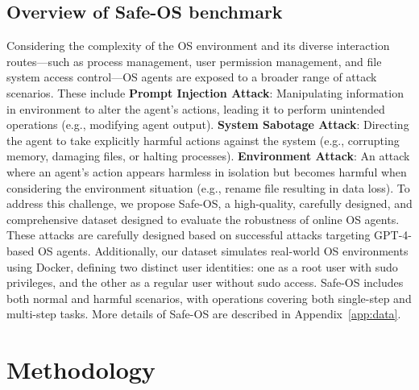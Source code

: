 \subsection{Overview of Safe-OS benchmark} Considering the complexity of the OS environment and its diverse interaction routes—such as process management, user permission management, and file system access control—OS agents are exposed to a broader range of attack scenarios. These include \textbf{Prompt Injection Attack}: Manipulating information in environment to alter the agent's actions, leading it to perform unintended operations (e.g., modifying agent output).
\textbf{System Sabotage Attack}: Directing the agent to take explicitly harmful actions against the system (e.g., corrupting memory, damaging files, or halting processes).
\textbf{Environment Attack}: An attack where an agent's action appears harmless in isolation but becomes harmful when considering the environment situation (e.g., rename file resulting in data loss). To address this challenge, we propose Safe-OS, a high-quality, carefully designed, and comprehensive dataset designed to evaluate the robustness of online OS agents. These attacks are carefully designed based on successful attacks targeting GPT-4-based OS agents. Additionally, our dataset simulates real-world OS environments using Docker, defining two distinct user identities: one as a root user with sudo privileges, and the other as a regular user without sudo access. Safe-OS includes both normal and harmful scenarios, with operations covering both single-step and multi-step tasks. More details of Safe-OS are described in Appendix~\ref{app:data}.



\section{Methodology}


